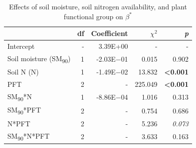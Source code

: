 \newpage
\begin{table}
    \centering
    \caption{Effects of soil moisture, soil nitrogen availability, and plant functional group on $\beta^*$}
        \begin{tabular}{p{3.75cm}p{0.5cm}p{2cm}p{1.5cm}p{1.5cm}}
            \hline 
            & \multicolumn{1}{r}{df} 
            & \multicolumn{1}{r}{Coefficient} 
            & \multicolumn{1}{r}{$\chi^{2}$} 
            & \multicolumn{1}{r}{\textit{p}} 
            \\ 
            \hline
            
            Intercept
            & \multicolumn{1}{r}{-}
            & \multicolumn{1}{r}{3.39E+00}
            & \multicolumn{1}{r}{-}
            & \multicolumn{1}{r}{-}
            \\

            Soil moisture (SM\textsubscript{90})
            & \multicolumn{1}{r}{1}
            & \multicolumn{1}{r}{-2.03E$-$01}
            & \multicolumn{1}{r}{0.015}
            & \multicolumn{1}{r}{0.902}
            \\

            Soil N (N)
            & \multicolumn{1}{r}{1}
            & \multicolumn{1}{r}{-1.49E$-$02}
            & \multicolumn{1}{r}{13.832}
            & \multicolumn{1}{r}{\textbf{<0.001}}
            \\

            PFT
            & \multicolumn{1}{r}{2}
            & \multicolumn{1}{r}{-}
            & \multicolumn{1}{r}{225.049}
            & \multicolumn{1}{r}{\textbf{<0.001}}
            \\

            SM\textsubscript{90}*N
            & \multicolumn{1}{r}{1}
            & \multicolumn{1}{r}{-8.86E$-$04}
            & \multicolumn{1}{r}{1.016}
            & \multicolumn{1}{r}{0.313}
            \\

            SM\textsubscript{90}*PFT
            & \multicolumn{1}{r}{2}
            & \multicolumn{1}{r}{-}
            & \multicolumn{1}{r}{0.754}
            & \multicolumn{1}{r}{0.686}
            \\

            N*PFT
            & \multicolumn{1}{r}{2}
            & \multicolumn{1}{r}{-}
            & \multicolumn{1}{r}{5.236}
            & \multicolumn{1}{r}{\textit{0.073}}
            \\

            SM\textsubscript{90}*N*PFT
            & \multicolumn{1}{r}{2}
            & \multicolumn{1}{r}{-}
            & \multicolumn{1}{r}{3.633}
            & \multicolumn{1}{r}{0.163}
            \\
            \hline
        \end{tabular}%
    \label{tab:table4.2}
\end{table}
